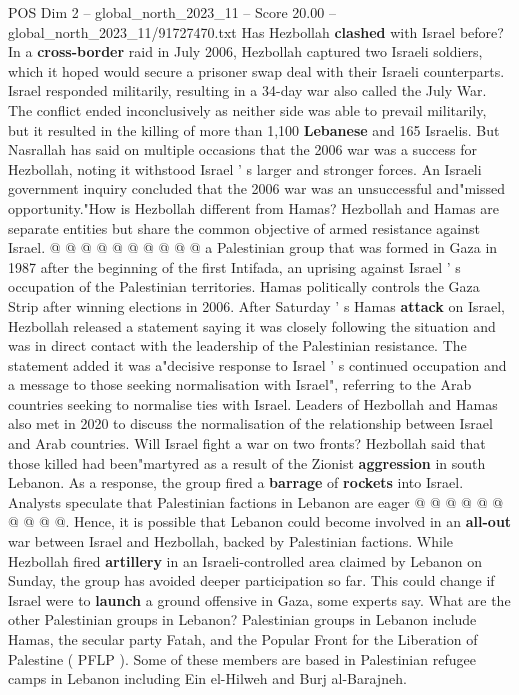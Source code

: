 \begin{textsample}{POS Dim 2 – global\_north\_2023\_11 – Score 20.00 – global\_north\_2023\_11/91727470.txt}
Has Hezbollah \textbf{clashed} with Israel before?
In a \textbf{cross-border} raid in July 2006, Hezbollah captured two Israeli soldiers, which it hoped would secure a prisoner swap deal with their Israeli counterparts.
Israel responded militarily, resulting in a 34-day war also called the July War.
The conflict ended inconclusively as neither side was able to prevail militarily, but it resulted in the killing of more than 1,100 \textbf{Lebanese} and 165 Israelis.
But Nasrallah has said on multiple occasions that the 2006 war was a success for Hezbollah, noting it withstood Israel ' s larger and stronger forces.
An Israeli government inquiry concluded that the 2006 war was an unsuccessful and"missed opportunity."How is Hezbollah different from Hamas?
Hezbollah and Hamas are separate entities but share the common objective of armed resistance against Israel. @ @ @ @ @ @ @ @ @ @ a Palestinian group that was formed in Gaza in 1987 after the beginning of the first Intifada, an uprising against Israel ' s occupation of the Palestinian territories.
Hamas politically controls the Gaza Strip after winning elections in 2006.
After Saturday ' s Hamas \textbf{attack} on Israel, Hezbollah released a statement saying it was closely following the situation and was in direct contact with the leadership of the Palestinian resistance.
The statement added it was a"decisive response to Israel ' s continued occupation and a message to those seeking normalisation with Israel", referring to the Arab countries seeking to normalise ties with Israel.
Leaders of Hezbollah and Hamas also met in 2020 to discuss the normalisation of the relationship between Israel and Arab countries.
Will Israel fight a war on two fronts?
Hezbollah said that those killed had been"martyred as a result of the Zionist \textbf{aggression} in south Lebanon.
As a response, the group fired a \textbf{barrage} of \textbf{rockets} into Israel.
Analysts speculate that Palestinian factions in Lebanon are eager @ @ @ @ @ @ @ @ @ @.
Hence, it is possible that Lebanon could become involved in an \textbf{all-out} war between Israel and Hezbollah, backed by Palestinian factions.
While Hezbollah fired \textbf{artillery} in an Israeli-controlled area claimed by Lebanon on Sunday, the group has avoided deeper participation so far.
This could change if Israel were to \textbf{launch} a ground offensive in Gaza, some experts say.
What are the other Palestinian groups in Lebanon?
Palestinian groups in Lebanon include Hamas, the secular party Fatah, and the Popular Front for the Liberation of Palestine ( PFLP ).
Some of these members are based in Palestinian refugee camps in Lebanon including Ein el-Hilweh and Burj al-Barajneh.

\end{textsample}
